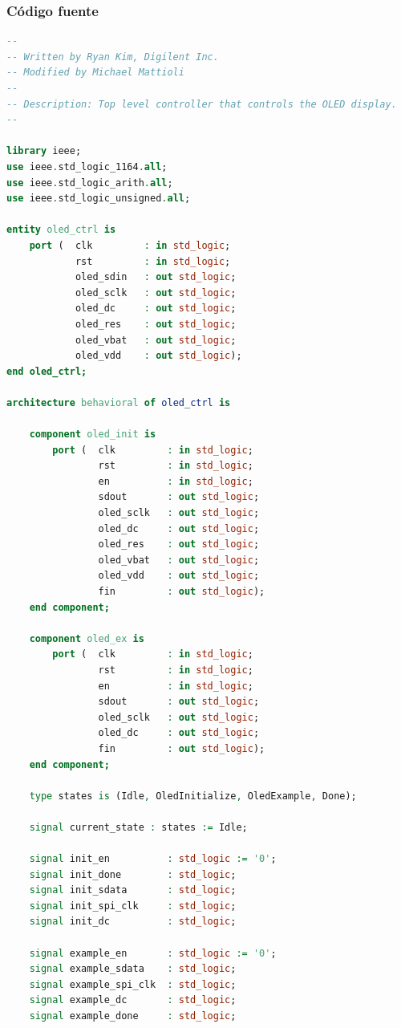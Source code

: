 \documentclass[a4paper,12pt]{article}
\begin{document}
\subsubsection*{Código fuente}
\begin{lstlisting}[language=VHDL,basicstyle=\ttfamily\small,frame=single,caption={oledctrl.vhd}]
--
-- Written by Ryan Kim, Digilent Inc.
-- Modified by Michael Mattioli
--
-- Description: Top level controller that controls the OLED display.
--

library ieee;
use ieee.std_logic_1164.all;
use ieee.std_logic_arith.all;
use ieee.std_logic_unsigned.all;

entity oled_ctrl is
    port (  clk         : in std_logic;
            rst         : in std_logic;
            oled_sdin   : out std_logic;
            oled_sclk   : out std_logic;
            oled_dc     : out std_logic;
            oled_res    : out std_logic;
            oled_vbat   : out std_logic;
            oled_vdd    : out std_logic);
end oled_ctrl;

architecture behavioral of oled_ctrl is

    component oled_init is
        port (  clk         : in std_logic;
                rst         : in std_logic;
                en          : in std_logic;
                sdout       : out std_logic;
                oled_sclk   : out std_logic;
                oled_dc     : out std_logic;
                oled_res    : out std_logic;
                oled_vbat   : out std_logic;
                oled_vdd    : out std_logic;
                fin         : out std_logic);
    end component;

    component oled_ex is
        port (  clk         : in std_logic;
                rst         : in std_logic;
                en          : in std_logic;
                sdout       : out std_logic;
                oled_sclk   : out std_logic;
                oled_dc     : out std_logic;
                fin         : out std_logic);
    end component;

    type states is (Idle, OledInitialize, OledExample, Done);

    signal current_state : states := Idle;

    signal init_en          : std_logic := '0';
    signal init_done        : std_logic;
    signal init_sdata       : std_logic;
    signal init_spi_clk     : std_logic;
    signal init_dc          : std_logic;

    signal example_en       : std_logic := '0';
    signal example_sdata    : std_logic;
    signal example_spi_clk  : std_logic;
    signal example_dc       : std_logic;
    signal example_done     : std_logic;


\end{lstlisting}
\end{document}
